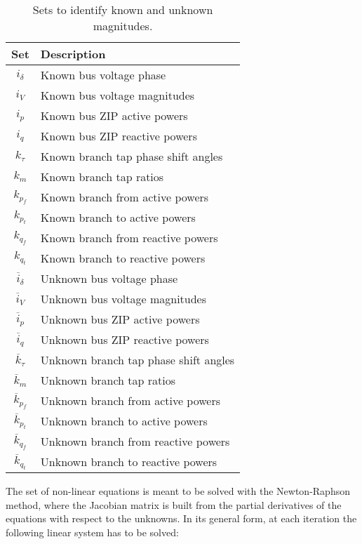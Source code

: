 \documentclass[11pt]{article}
\begin{document}
\begin{table}[!htb]
	\centering
	\caption{Sets to identify known and unknown magnitudes.}
	\begin{tabular}{cl}
		\hline
		\textbf{Set} & \textbf{Description} \\
		\hline
		$i_\delta$ & Known bus voltage phase \\
		$i_V$ & Known bus voltage magnitudes \\
		$i_p$ & Known bus ZIP active powers \\
		$i_q$ & Known bus ZIP reactive powers \\
		$k_\tau$ & Known branch tap phase shift angles \\
		$k_m$ & Known branch tap ratios \\
		$k_{p_f}$ & Known branch from active powers \\
		$k_{p_t}$ & Known branch to active powers \\
		$k_{q_f}$ & Known branch from reactive powers \\
		$k_{q_t}$ & Known branch to reactive powers \\
		$\overline{i}_\delta$ & Unknown bus voltage phase \\
		$\overline{i}_V$ & Unknown bus voltage magnitudes \\
		$\overline{i}_p$ & Unknown bus ZIP active powers \\
		$\overline{i}_q$ & Unknown bus ZIP reactive powers \\
		$\overline{k}_\tau$ & Unknown branch tap phase shift angles \\
		$\overline{k}_m$ & Unknown branch tap ratios \\
		$\overline{k}_{p_f}$ & Unknown branch from active powers \\
		$\overline{k}_{p_t}$ & Unknown branch to active powers \\
		$\overline{k}_{q_f}$ & Unknown branch from reactive powers \\
		$\overline{k}_{q_t}$ & Unknown branch to reactive powers \\
		\hline
	\end{tabular}
	\label{tab:sets}
\end{table}
The set of non-linear equations is meant to be solved with the Newton-Raphson method, where the Jacobian matrix is built from the partial derivatives of the equations with respect to the unknowns. In its general form, at each iteration the following linear system has to be solved:
\setlength{\arraycolsep}{1.5pt}
\end{document}
